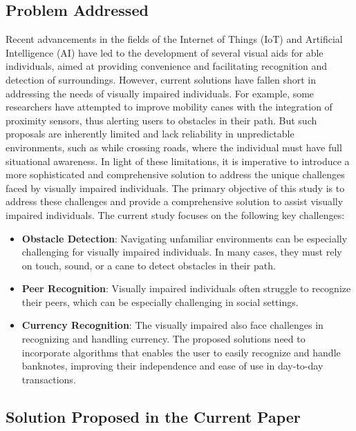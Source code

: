 \documentclass[journal,12pt,onecolumn,letterpaper]{IEEEtran}
\begin{document}
\subsection{Problem Addressed}
Recent advancements in the fields of the Internet of Things (IoT) and Artificial Intelligence (AI) have led to the development of several visual aids for able individuals, aimed at providing convenience and facilitating recognition and detection of surroundings. However, current solutions have fallen short in addressing the needs of visually impaired individuals. For example, some researchers have attempted to improve mobility canes with the integration of proximity sensors, thus alerting users to obstacles in their path. But such proposals are inherently limited and lack reliability in unpredictable environments, such as while crossing roads, where the individual must have full situational awareness. In light of these limitations, it is imperative to introduce a more sophisticated and comprehensive solution to address the unique challenges faced by visually impaired individuals. The primary objective of this study is to address these challenges and provide a comprehensive solution to assist visually impaired individuals. The current study focuses on the following key challenges:
\begin{itemize}
\item \textbf{Obstacle Detection}: Navigating unfamiliar environments can be especially challenging for visually impaired individuals. In many cases, they must rely on touch, sound, or a cane to detect obstacles in their path.

\item \textbf{Peer Recognition}: Visually impaired individuals often struggle to recognize their peers, which can be especially challenging in social settings. 

\item \textbf{Currency Recognition}: The visually impaired also face challenges in recognizing and handling currency. The proposed solutions need to incorporate algorithms that enables the user to easily recognize and handle banknotes, improving their independence and ease of use in day-to-day transactions.
\end{itemize}

\subsection{Solution Proposed in the Current Paper}
\end{document}
